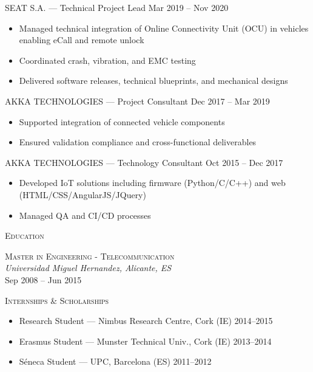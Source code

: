 \documentclass[11pt, a4paper]{article}
\newcommand{\headright}[1]{\vspace*{2ex}\hspace*{-1mm}%
    \textsc{\large\color{cvblue}#1}\par%
    \vspace*{-1.8ex}{\color{cvblue}\hrulefill}\par}
\begin{document}
\begin{minipage}[t]{0.59\textwidth}
\noindent\textsc{SEAT S.A.} --- Technical Project Lead \hfill Mar 2019 -- Nov 2020
\begin{itemize}[leftmargin=*, label=--, itemsep=0.5ex]
\item Managed technical integration of Online Connectivity Unit (OCU) in vehicles enabling eCall and remote unlock
\item Coordinated crash, vibration, and EMC testing
\item Delivered software releases, technical blueprints, and mechanical designs
\end{itemize}

\noindent\textsc{AKKA TECHNOLOGIES} --- Project Consultant \hfill Dec 2017 -- Mar 2019
\begin{itemize}[leftmargin=*, label=--, itemsep=0.5ex]
\item Supported integration of connected vehicle components
\item Ensured validation compliance and cross-functional deliverables
\end{itemize}

\noindent\textsc{AKKA TECHNOLOGIES} --- Technology Consultant \hfill Oct 2015 -- Dec 2017
\begin{itemize}[leftmargin=*, label=--, itemsep=0.5ex]
\item Developed IoT solutions including firmware (Python/C/C++) and web (HTML/CSS/AngularJS/JQuery)
\item Managed QA and CI/CD processes
\end{itemize}

\headright{Education}

\noindent\textsc{Master in Engineering - Telecommunication} \\
\textit{Universidad Miguel Hernandez, Alicante, ES} \\
Sep 2008 -- Jun 2015

\headright{Internships \& Scholarships}

\begin{itemize}[leftmargin=*, label=--, itemsep=0.5ex]
\item Research Student --- Nimbus Research Centre, Cork (IE) \hfill 2014--2015
\item Erasmus Student --- Munster Technical Univ., Cork (IE) \hfill 2013--2014
\item Séneca Student --- UPC, Barcelona (ES) \hfill 2011--2012
\end{itemize}

\end{minipage}
\end{document}
